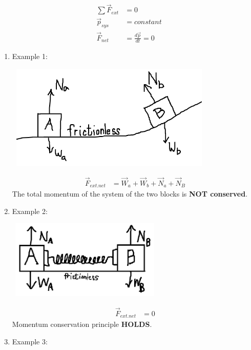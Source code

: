 \documentclass{article}
\begin{document}
\begin{enumerate}
            \begin{align*}
                \sum \vec{F}_{ext}&=0 \\
                \vec{p}_{sys}&=constant \\
                \vec{F}_{net}&=\frac{d\vec{p}}{dt}=0
            \end{align*}  
            \begin{enumerate}
                \item Example 1: \\
                \begin{center}\includegraphics[width=10cm, height=5cm]{1.PNG}\end{center}
                \begin{align*}
                    \vec{F}_{ext. net}&=\vec{W}_a+\vec{W}_b+\vec{N}_a+\vec{N}_B
                \end{align*}  
                The total momentum of the system of the two blocks is \textbf{NOT conserved}. \\
                \item Example 2: \\
                \begin{center}\includegraphics[width=7.5cm, height=3.75cm]{2.PNG}\end{center}
                \begin{align*}
                    \vec{F}_{ext. net}&=0
                \end{align*} 
                Momentum conservation principle \textbf{HOLDS}. \\
                \item Example 3: \\

\end{enumerate}
\end{enumerate}
\end{document}
